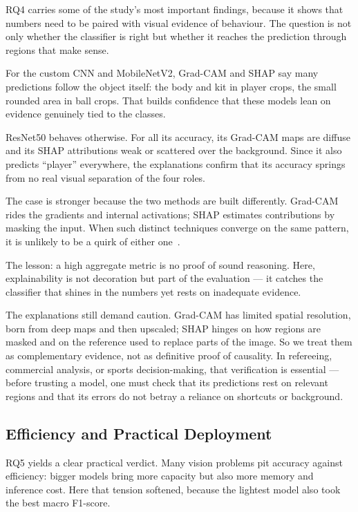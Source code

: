 \documentclass[preprint,12pt]{elsarticle}
\begin{document}
RQ4 carries some of the study's most important findings, because it shows that numbers need to be paired with visual evidence of behaviour. The question is not only whether the classifier is right but whether it reaches the prediction through regions that make sense.

For the custom CNN and MobileNetV2, Grad-CAM and SHAP say many predictions follow the object itself: the body and kit in player crops, the small rounded area in ball crops. That builds confidence that these models lean on evidence genuinely tied to the classes.

ResNet50 behaves otherwise. For all its accuracy, its Grad-CAM maps are diffuse and its SHAP attributions weak or scattered over the background. Since it also predicts ``player'' everywhere, the explanations confirm that its accuracy springs from no real visual separation of the four roles.

The case is stronger because the two methods are built differently. Grad-CAM rides the gradients and internal activations; SHAP estimates contributions by masking the input. When such distinct techniques converge on the same pattern, it is unlikely to be a quirk of either one~\cite{nazir2023survey}.

The lesson: a high aggregate metric is no proof of sound reasoning. Here, explainability is not decoration but part of the evaluation --- it catches the classifier that shines in the numbers yet rests on inadequate evidence.

The explanations still demand caution. Grad-CAM has limited spatial resolution, born from deep maps and then upscaled; SHAP hinges on how regions are masked and on the reference used to replace parts of the image. So we treat them as complementary evidence, not as definitive proof of causality. In refereeing, commercial analysis, or sports decision-making, that verification is essential --- before trusting a model, one must check that its predictions rest on relevant regions and that its errors do not betray a reliance on shortcuts or background.

\subsection{Efficiency and Practical Deployment}

RQ5 yields a clear practical verdict. Many vision problems pit accuracy against efficiency: bigger models bring more capacity but also more memory and inference cost. Here that tension softened, because the lightest model also took the best macro F1-score.
\end{document}
